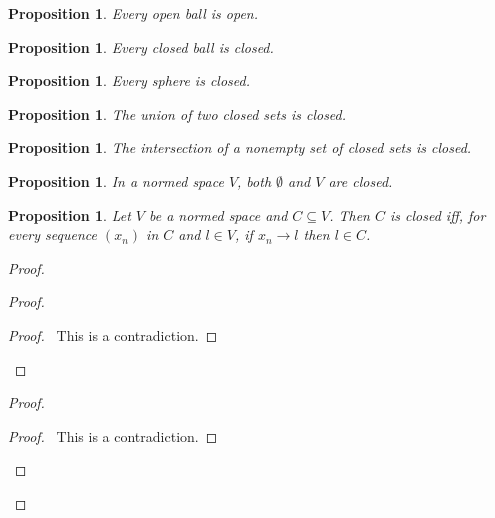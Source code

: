 \documentclass{book}
\let\qed\relax
\newtheorem{prop}[ax]{Proposition}
\theoremstyle{definition}
\begin{document}
\begin{prop}
Every open ball is open.
\end{prop}

\begin{prop}
\label{prop:closedball}
Every closed ball is closed.
\end{prop}

\begin{prop}
Every sphere is closed.
\end{prop}

\begin{prop}
The union of two closed sets is closed.
\end{prop}

\begin{prop}
The intersection of a nonempty set of closed sets is closed.
\end{prop}

\begin{prop}
In a normed space $V$, both $\emptyset$ and $V$ are closed.
\end{prop}

\begin{prop}
\label{prop:closedconverge}
Let $V$ be a normed space and $C \subseteq V$. Then $C$ is closed iff, for every sequence $(x_n)$ in $C$ and $l \in V$, if $x_n \rightarrow l$ then $l \in C$.
\end{prop}

\begin{proof}
\pf
{}
\begin{proof}
	\qedstep
	\begin{proof}
		\pf\ This is a contradiction.
	\end{proof}
\end{proof}
\begin{proof}
	\qedstep
	\begin{proof}
		\pf\ This is a contradiction.
	\end{proof}
\end{proof}
\qed
\end{proof}
\end{document}
